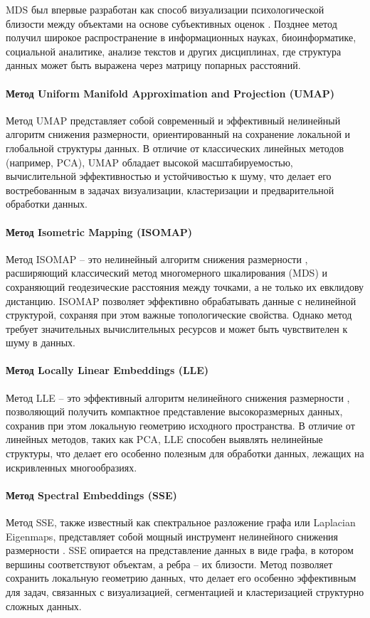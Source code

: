             MDS был впервые разработан как способ визуализации психологической близости между объектами на основе субъективных оценок \cite{Kruskal1964mds}. Позднее метод получил широкое распространение в информационных науках, биоинформатике, социальной аналитике, анализе текстов и других дисциплинах, где структура данных может быть выражена через матрицу попарных расстояний.

        \paragraph{Метод Uniform Manifold Approximation and Projection (UMAP)}
            Метод UMAP \cite{McInnes2018UMAP} представляет собой современный и эффективный нелинейный алгоритм снижения размерности, ориентированный на сохранение локальной и глобальной структуры данных. В отличие от классических линейных методов (например, PCA), UMAP обладает высокой масштабируемостью, вычислительной эффективностью и устойчивостью к шуму, что делает его востребованным в задачах визуализации, кластеризации и предварительной обработки данных.

        \paragraph{Метод Isometric Mapping (ISOMAP)}
            Метод ISOMAP -- это нелинейный алгоритм снижения размерности \cite{Tenenbaum2000isomap}, расширяющий классический метод многомерного шкалирования (MDS) и сохраняющий геодезические расстояния между точками, а не только их евклидову дистанцию. ISOMAP позволяет эффективно обрабатывать данные с нелинейной структурой, сохраняя при этом важные топологические свойства. Однако метод требует значительных вычислительных ресурсов и может быть чувствителен к шуму в данных.

        \paragraph{Метод Locally Linear Embeddings (LLE)}
            Метод LLE -- это эффективный алгоритм нелинейного снижения размерности \cite{Roweis2000LLE}, позволяющий получить компактное представление высокоразмерных данных, сохранив при этом локальную геометрию исходного пространства. В отличие от линейных методов, таких как PCA, LLE способен выявлять нелинейные структуры, что делает его особенно полезным для обработки данных, лежащих на искривленных многообразиях.

        \paragraph{Метод Spectral Embeddings (SSE)}
            Метод SSE, также известный как спектральное разложение графа или Laplacian Eigenmaps, представляет собой мощный инструмент нелинейного снижения размерности \cite{Belkin2001laplacian}. SSE опирается на представление данных в виде графа, в котором вершины соответствуют объектам, а ребра -- их близости. Метод позволяет сохранить локальную геометрию данных, что делает его особенно эффективным для задач, связанных с визуализацией, сегментацией и кластеризацией структурно сложных данных.

